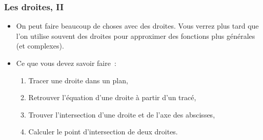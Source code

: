 \documentclass[10pt,notheorems]{beamer}
\theoremstyle{plain}
\theoremstyle{definition} %
\begin{document}
\begin{frame}
\end{frame}


\begin{frame}
  \frametitle{Les droites, II}
  \hypertarget{slide_droites_2}{}

  \bigskip

  \begin{itemize}

  \item On peut faire beaucoup de choses avec des droites. Vous verrez plus tard que l'on utilise souvent des droites pour approximer des fonctions plus générales (et complexes).\newline

  \item Ce que vous devez savoir faire~:\newline

    \begin{enumerate}

    \item Tracer une droite dans un plan,\newline

    \item Retrouver l'équation d'une droite à partir d'un tracé,\newline

    \item Trouver l'intersection d'une droite et de l'axe des abscisses,\newline

    \item Calculer le point d'intersection de deux droites.\newline

    \end{enumerate}

  \end{itemize}

\end{frame}
\end{document}
